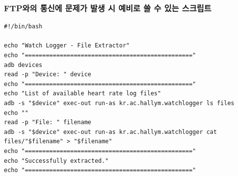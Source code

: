 \documentclass[aspectratio=169]{beamer}
\begin{document}
    \begin{frame}[fragile]
        \frametitle{FTP와의 통신에 문제가 발생 시 예비로 쓸 수 있는 스크립트}
        \begin{verbatim}
#!/bin/bash

echo "Watch Logger - File Extractor"
echo "================================================"
adb devices
read -p "Device: " device
echo "================================================"
echo "List of available heart rate log files"
adb -s "$device" exec-out run-as kr.ac.hallym.watchlogger ls files
echo ""
read -p "File: " filename
adb -s "$device" exec-out run-as kr.ac.hallym.watchlogger cat files/"$filename" > "$filename"
echo "================================================"
echo "Successfully extracted."
echo "================================================"
        \end{verbatim}
    \end{frame}
\end{document}
